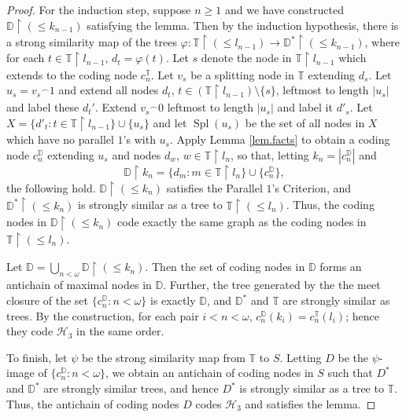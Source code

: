 \documentclass{amsart}
\theoremstyle{remark}
\theoremstyle{definition}
\theoremstyle{remark}
\newcommand{\om}{\omega}
\DeclareMathOperator{\Spl}{Spl}
\newcommand{\re}{\restriction}
\newcommand{\bD}{\mathbb{D}}
\newcommand{\bT}{\mathbb{T}}
\newcommand{\ra}{\rightarrow}
\newcommand{\POC}{Parallel $1$'s Criterion}
\begin{document}
\begin{proof}
For the induction step,
suppose $n\ge 1$ and we have constructed $\bD\re (\le k_{n-1})$
 satisfying the lemma.
Then by the induction hypothesis,
there is a strong similarity map  of the trees
$\varphi :\bT\re(\le l_{n-1})\ra \bD^*\re (\le k_{n-1})$,
where
for each $t\in \bT\re l_{n-1}$,
$d_t=\varphi(t)$.
Let $s$ denote the  node  in $\bT\re l_{n-1}$  which  extends to the coding node $c^{\bT}_n$.
Let $v_s$ be a splitting node in $\bT$ extending $d_s$.
Let $u_s={v_s}^{\frown}1$
and extend all nodes $d_t$,
$t\in (\bT\re l_{n-1})\setminus\{s\}$,
 leftmost to length $|u_s|$ and label these $d_t'$.
Extend ${v_s}^{\frown}0$ leftmost to length $|u_s|$ and label it $d'_s$.
Let $X=\{d'_t:t\in \bT\re l_{n-1}\}\cup\{u_s\}$ and let $\Spl(u_s)$ be the set of all nodes in $X$ which have no parallel $1$'s with $u_s$.
Apply Lemma \ref{lem.facts} to obtain a coding node $c^{\bD}_n$ extending $u_s$
and nodes $d_w$, $w\in \bT\re l_n$,
so that,
letting  $k_n=|c^{\bD}_n|$
and
\begin{equation}
\bD\re k_n=
\{d_m:m\in \bT\re l_n\}\cup\{c^{\bD}_n\},
\end{equation}
 the following hold.
$\bD\re(\le k_n)$ satisfies the \POC,
and
$\bD^*\re(\le k_n)$ is strongly similar  as  a tree
to
$\bT\re (\le l_n)$.
Thus, the coding nodes in $\bD\re (\le k_n)$
code exactly the same graph as the coding nodes in $\bT\re (\le l_n)$.


Let $\bD=\bigcup_{n<\om}\bD\re(\le k_n)$.
Then the set of coding nodes in  $\bD$  forms an antichain of maximal nodes in $\bD$.
Further,
the tree generated by the
 the meet closure of the set $\{c^{\bD}_n:n<\om\}$
is exactly  $\bD$,
and
 $\bD^*$  and  $\bT$
are strongly similar as trees.
By the construction,
for each pair $i<n<\om$, $c^{\bD}_n(k_i)=c^{\bT}_n(l_i)$;
 hence they code $\mathcal{H}_3$ in the same order.



To finish,  let $\psi$ be the strong similarity  map   from $\bT$ to $S$.
Letting $D$ be the $\psi$-image of $\{c^{\bD}_n:n<\om\}$,
we obtain an antichain  of coding nodes in $S$
such that $D^*$ and $\bD^*$ are strongly similar trees,
and hence $D^*$ is strongly similar as  a tree to $\bT$.
Thus, the antichain of coding nodes $D$
 codes $\mathcal{H}_3$ and satisfies  the lemma.
\end{proof}
\end{document}
